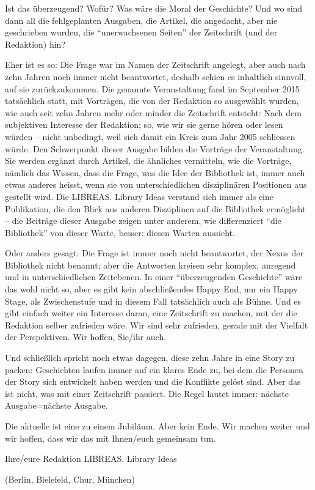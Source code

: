Ist das überzeugend? Wofür? Was wäre die Moral der Geschichte? Und wo
sind dann all die fehlgeplanten Ausgaben, die Artikel, die angedacht,
aber nie geschrieben wurden, die \enquote{unerwachsenen Seiten} der
Zeitschrift (und der Redaktion) hin?

Eher ist es so: Die Frage war im Namen der Zeitschrift angelegt, aber
auch nach zehn Jahren noch immer nicht beantwortet, deshalb schien es
inhaltlich sinnvoll, auf sie zurückzukommen. Die genannte Veranstaltung
fand im September 2015 tatsächlich statt, mit Vorträgen, die von der
Redaktion so ausgewählt wurden, wie auch seit zehn Jahren mehr oder
minder die Zeitschrift entsteht: Nach dem subjektiven Interesse der
Redaktion; so, wie wir sie gerne hören oder lesen würden -- nicht
unbedingt, weil sich damit ein Kreis zum Jahr 2005 schliessen würde. Den
Schwerpunkt dieser Ausgabe bilden die Vorträge der Veranstaltung. Sie
werden ergänzt durch Artikel, die ähnliches vermitteln, wie die
Vorträge, nämlich das Wissen, dass die Frage, was die Idee der
Bibliothek ist, immer auch etwas anderes heisst, wenn sie von
unterschiedlichen disziplinären Positionen aus gestellt wird. Die
LIBREAS. Library Ideas verstand sich immer als eine Publikation, die den
Blick aus anderen Disziplinen auf die Bibliothek ermöglicht -- die
Beiträge dieser Ausgabe zeigen unter anderem, wie differenziert
\enquote{die Bibliothek} von dieser Warte, besser: diesen Warten
aussieht.

Oder anders gesagt: Die Frage ist immer noch nicht beantwortet, der
Nexus der Bibliothek nicht benannt; aber die Antworten kreisen sehr
komplex, anregend und in unterschiedlichen Zeitebenen. In einer
\enquote{überzeugenden Geschichte} wäre das wohl nicht so, aber es gibt
kein abschließendes Happy End, nur ein Happy Stage, als Zwischenstufe
und in diesem Fall tatsächlich auch als Bühne. Und es gibt einfach
weiter ein Interesse daran, eine Zeitschrift zu machen, mit der die
Redaktion selber zufrieden wäre. Wir sind sehr zufrieden, gerade mit der
Vielfalt der Perspektiven. Wir hoffen, Sie/ihr auch.

Und schließlich spricht noch etwas dagegen, diese zehn Jahre in eine
Story zu packen: Geschichten laufen immer auf ein klares Ende zu, bei
dem die Personen der Story sich entwickelt haben werden und die
Konflikte gelöst sind. Aber das ist nicht, was mit einer Zeitschrift
passiert. Die Regel lautet immer: nächste Ausgabe=nächste Ausgabe. 

Die aktuelle ist eine zu einem Jubiläum. Aber kein Ende. Wir machen weiter
und wir hoffen, dass wir das mit Ihnen/euch gemeinsam tun.

\vspace{5mm}

\noindent Ihre/eure Redaktion LIBREAS. Library Ideas

\noindent (Berlin, Bielefeld, Chur, München)

